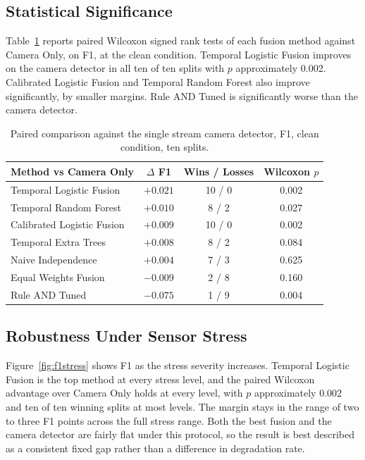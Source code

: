 \documentclass[conference]{IEEEtran}
\begin{document}
\subsection{Statistical Significance}
Table~\ref{tab:wilcoxon} reports paired Wilcoxon signed rank tests of each fusion
method against Camera Only, on F1, at the clean condition. Temporal Logistic
Fusion improves on the camera detector in all ten of ten splits with $p$
approximately 0.002. Calibrated Logistic Fusion and Temporal Random Forest also
improve significantly, by smaller margins. Rule AND Tuned is significantly worse
than the camera detector.

\begin{table}[t]
\centering
\caption{Paired comparison against the single stream camera detector, F1, clean
condition, ten splits.}
\label{tab:wilcoxon}
\begin{tabular}{lccc}
\toprule
Method vs Camera Only & $\Delta$ F1 & Wins / Losses & Wilcoxon $p$ \\
\midrule
Temporal Logistic Fusion    & $+0.021$ & 10 / 0 & 0.002 \\
Temporal Random Forest      & $+0.010$ & 8 / 2  & 0.027 \\
Calibrated Logistic Fusion  & $+0.009$ & 10 / 0 & 0.002 \\
Temporal Extra Trees        & $+0.008$ & 8 / 2  & 0.084 \\
Naive Independence          & $+0.004$ & 7 / 3  & 0.625 \\
Equal Weights Fusion        & $-0.009$ & 2 / 8  & 0.160 \\
Rule AND Tuned              & $-0.075$ & 1 / 9  & 0.004 \\
\bottomrule
\end{tabular}
\end{table}

\subsection{Robustness Under Sensor Stress}
Figure~\ref{fig:f1stress} shows F1 as the stress severity increases. Temporal
Logistic Fusion is the top method at every stress level, and the paired Wilcoxon
advantage over Camera Only holds at every level, with $p$ approximately 0.002 and
ten of ten winning splits at most levels. The margin stays in the range of two to
three F1 points across the full stress range. Both the best fusion and the camera
detector are fairly flat under this protocol, so the result is best described as
a consistent fixed gap rather than a difference in degradation rate.
\end{document}
